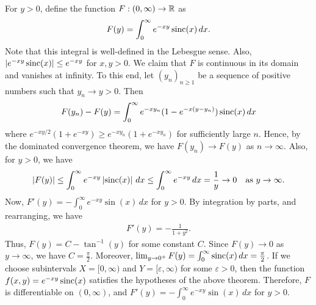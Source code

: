 For $y > 0$, define the function $F:(0,\infty) \to \mathbb{R}$ as
\begin{align}
    F(y) = \int_{0}^{\infty} e^{-xy} \operatorname{sinc}(x) \, dx.
\end{align}
Note that this integral is well-defined in the Lebesgue sense. Also, $\left| e^{-xy} \operatorname{sinc}(x) \right| \leq e^{-xy}$ for $x,y > 0$. We claim that $F$ is continuous in its domain and vanishes at infinity. To this end, let $(y_{n})_{n \geq 1}$ be a sequence of positive numbers such that $y_{n} \to y > 0$. Then
\begin{align}
    F(y_{n}) - F(y) = \int_{0}^{\infty} e^{-xy_{n}}(1-e^{-x(y-y_{n})}) \operatorname{sinc}(x) \, dx
\end{align}
where $e^{-xy/2}(1+e^{-xy}) \geq e^{-xy_{n}}(1+e^{-xy_{n}})$ for sufficiently large $n$. Hence, by the dominated convergence theorem, we have $F(y_{n}) \to F(y)$ as $n \to \infty$. Also, for $y > 0$, we have
\begin{align}
    \left| F(y) \right| \leq \int_{0}^{\infty} e^{-xy} \left| \operatorname{sinc}(x) \right| \, dx \leq \int_{0}^{\infty} e^{-xy} \, dx = \frac{1}{y} \to 0 \quad \text{as } y \to \infty.
\end{align}
Now, $F'(y) = -\int_{0}^{\infty} e^{-xy} \sin(x) \, dx$ for $y > 0$. By integration by parts, and rearranging, we have
\begin{align}
    F'(y) = -\frac{1}{1+y^{2}}.
\end{align}
Thus, $F(y) = C - \tan^{-1}(y)$ for some constant $C$. Since $F(y) \to 0$ as $y \to \infty$, we have $C = \frac{\pi}{2}$. Moreover, $\lim_{y \to 0^{+}} F(y) = \int_{0}^{\infty} \operatorname{sinc}(x) \, dx = \frac{\pi}{2}$. If we choose subintervals $X = [0,\infty)$ and $Y = [\varepsilon, \infty)$ for some $\varepsilon > 0$, then the function $f(x,y) = e^{-xy} \operatorname{sinc}(x)$ satisfies the hypotheses of the above theorem. Therefore, $F$ is differentiable on $(0,\infty)$, and $F'(y) = -\int_{0}^{\infty} e^{-xy} \sin(x) \, dx$ for $y > 0$.

